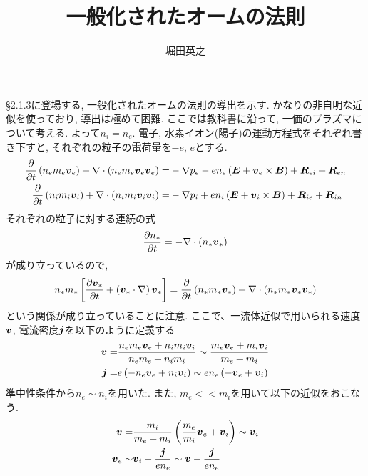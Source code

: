 \documentclass[12pt,a4j]{ltjarticle}
\title{一般化されたオームの法則}
\author{堀田英之}
\newcommand{\bm}[1]{{\mbox{\boldmath $#1$}}}
\begin{document}
\maketitle
    \S 2.1.3に登場する, 一般化されたオームの法則の導出を示す. かなりの非自明な近似を使っており, 導出は極めて困難.    
    ここでは教科書に沿って, 一価のプラズマについて考える. よって$n_i=n_e$.
    電子, 水素イオン(陽子)の運動方程式をそれぞれ書き下すと, それぞれの粒子の電荷量を$-e$, $e$とする.
    \begin{align}
        \frac{\partial}{\partial t}\left(n_em_e\bm{v}_e\right) 
        + \nabla\cdot\left(n_em_e\bm{v}_e\bm{v}_e\right) =&
         - \nabla p_e -
        en_e\left(\bm{E}+\bm{v}_e\times\bm{B}\right) + \bm{R}_{ei} + \bm{R}_{en} 
        \label{eom_electron}
        \\
        \frac{\partial}{\partial t}\left(n_im_i\bm{v}_i\right) 
        + \nabla\cdot\left(n_im_i\bm{v}_i\bm{v}_i\right) =&
         - \nabla p_i + 
        en_i\left(\bm{E}+\bm{v}_i\times\bm{B}\right) + \bm{R}_{ie} + \bm{R}_{in}
        \label{eom_proton}
    \end{align}
    それぞれの粒子に対する連続の式
    \begin{align}
        \frac{\partial n_*}{\partial t} = -\nabla\cdot\left(n_*\bm{v}_*\right)
    \end{align}
    が成り立っているので, 
    \begin{align}
        n_*m_*
        \left[
        \frac{\partial \bm{v}_*}{\partial t} + \left(\bm{v}_*\cdot\nabla\right)\bm{v}_*
        \right] = \frac{\partial}{\partial t}\left(n_*m_*\bm{v}_*\right) 
        + \nabla\cdot\left(n_*m_*\bm{v}_*\bm{v}_*\right)
    \end{align}
    という関係が成り立っていることに注意.
    ここで、一流体近似で用いられる速度$\bm{v}$, 電流密度$\bm{j}$を以下のように定義する
    \begin{align}
        \bm{v} =& \frac{n_em_e\bm{v}_e + n_im_i\bm{v}_i}{n_em_e + n_im_i} \sim
        \frac{m_e\bm{v}_e + m_i\bm{v}_i}{m_e +m_i}\\
        \bm{j} =& e\left(-n_e\bm{v}_e + n_i\bm{v}_i\right) \sim en_e \left(-\bm{v}_e + \bm{v}_i\right)
    \end{align}
    準中性条件から$n_e\sim n_i$を用いた.
    また, $m_e<<m_i$を用いて以下の近似をおこなう.
    \begin{align}
        \bm{v} =& \frac{m_i}{m_e + m_i}\left(\frac{m_e}{m_i}\bm{v}_e + \bm{v}_i\right)\sim \bm{v}_i \label{total_velocity}\\
        \bm{v}_e \sim& \bm{v}_i - \frac{\bm{j}}{en_e} \sim \bm{v} - \frac{\bm{j}}{en_e} \label{electron_velocity}
    \end{align}
\end{document}
